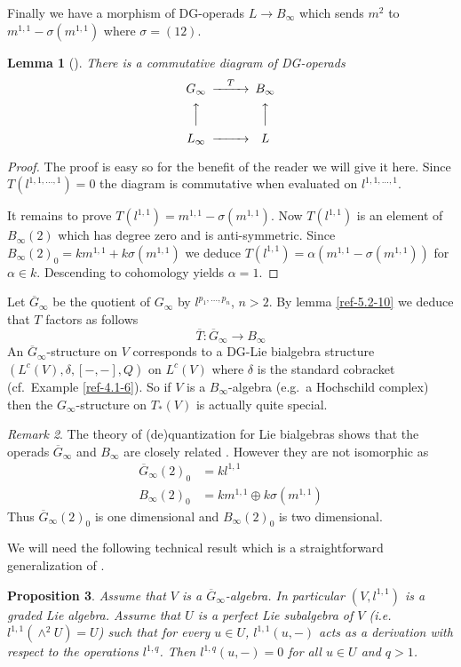 \documentclass{amsart}
\numberwithin{equation}{section}
\newtheorem{lemma}{Lemma}[section]
\newtheorem{proposition}[lemma]{Proposition}
\theoremstyle{definition}
\theoremstyle{remark}
\newtheorem{remark}[lemma]{Remark}
\begin{document}
Finally we have a morphism of DG-operads $L\rightarrow B_\infty$ which sends $m^2$
to $m^{1,1}-\sigma(m^{1,1})$ where $\sigma=(12)$. 
\begin{lemma}[\cite{Tamarkin}] There is a commutative diagram of DG-operads
\[
\begin{CD}
G_\infty @>T>> B_\infty\\
@AAA @AAA\\
L_\infty @>>> L
\end{CD}
\]
\end{lemma}
\begin{proof} The proof is easy so for the benefit of the reader we
  will give it here. Since $T(l^{1,1,\ldots,1})=0$ the diagram is
  commutative when evaluated on $l^{1,1,\ldots,1}$.

  It remains to prove $T(l^{1,1})=m^{1,1}-\sigma(m^{1,1})$. Now
  $T(l^{1,1})$ is an element of $B_\infty(2)$ which has degree zero and
  is anti-symmetric. Since $B_\infty(2)_0=km^{1,1}+k\sigma(m^{1,1})$ we
  deduce $T(l^{1,1})=\alpha(m^{1,1}-\sigma(m^{1,1}))$ for $\alpha\in k$.
  Descending to cohomology yields $\alpha=1$.
\end{proof}
Let $\overline{G}_\infty$ be the quotient of $G_\infty$
by $l^{p_1,\ldots,p_n}$, $n>2$. By lemma \ref{ref-5.2-10} we deduce that $T$
factors as follows
\[
\overline{T}:\overline{G}_\infty\rightarrow B_\infty
\]
An $\overline{G}_\infty$-structure on $V$ corresponds to a DG-Lie bialgebra
structure
$(L^c(V),\delta,[-,-],Q)$ on $L^c(V)$ where $\delta$ is the standard
cobracket (cf.~Example \ref{ref-4.1-6}). So if $V$ is a $B_\infty$-algebra (e.g.\
a Hochschild complex) then the $G_\infty$-structure on $T_\ast(V)$ is actually 
quite special. 
\begin{remark} The theory of (de)quantization for Lie bialgebras
  \cite{EK1,EK2} shows that the operads $\overline{G}_\infty$ and
  $B_\infty$ are closely related \cite{GH}. However they are not
  isomorphic as
\begin{align*}
\overline{G}_\infty(2)_0&=kl^{1,1}\\
{B}_\infty(2)_0&=km^{1,1}\oplus k\sigma(m^{1,1})
\end{align*}
Thus $\overline{G}_\infty(2)_0$ is one dimensional and $B_\infty(2)_0$ is two
dimensional.
\end{remark}
We will need the following technical result which is a straightforward generalization of \cite[Lemma 4.7]{halb}. 
\begin{proposition}\label{ref-5.5-11}
Assume that $V$ is a $\overline{G}_\infty$-algebra. In particular $(V,l^{1,1})$ is a graded Lie
algebra. Assume that $U$ is a perfect Lie subalgebra of $V$ (i.e.\ $l^{1,1}(\wedge^2 U)=U$) such 
that for every $u\in U$, $l^{1,1}(u,-)$ acts as a derivation with respect to the operations $l^{1,q}$. 
Then $l^{1,q}(u,-)=0$ for all $u\in U$ and $q>1$.
\end{proposition}
\end{document}
